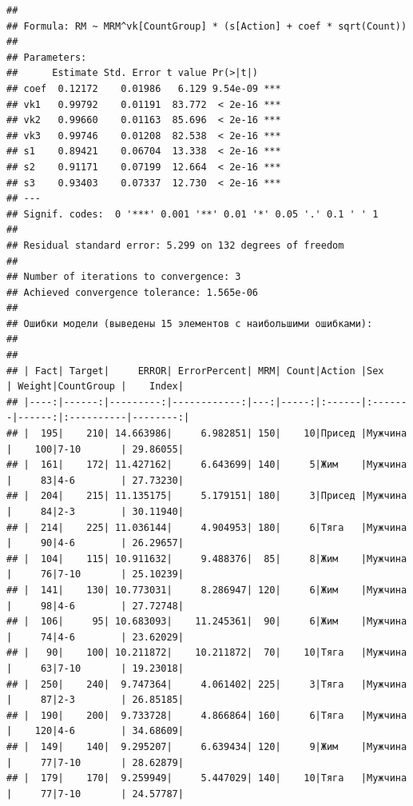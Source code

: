 \documentclass[
]{article}
\newenvironment{Shaded}{\begin{snugshade}}{\end{snugshade}}
\newcommand{\KeywordTok}[1]{\textcolor[rgb]{0.13,0.29,0.53}{\textbf{#1}}}
\newcommand{\NormalTok}[1]{#1}
\newcommand{\OperatorTok}[1]{\textcolor[rgb]{0.81,0.36,0.00}{\textbf{#1}}}
\newcommand{\StringTok}[1]{\textcolor[rgb]{0.31,0.60,0.02}{#1}}
\begin{document}
\begin{Shaded}
\end{Shaded}

\begin{verbatim}
## 
## Formula: RM ~ MRM^vk[CountGroup] * (s[Action] + coef * sqrt(Count))
## 
## Parameters:
##      Estimate Std. Error t value Pr(>|t|)    
## coef  0.12172    0.01986   6.129 9.54e-09 ***
## vk1   0.99792    0.01191  83.772  < 2e-16 ***
## vk2   0.99660    0.01163  85.696  < 2e-16 ***
## vk3   0.99746    0.01208  82.538  < 2e-16 ***
## s1    0.89421    0.06704  13.338  < 2e-16 ***
## s2    0.91171    0.07199  12.664  < 2e-16 ***
## s3    0.93403    0.07337  12.730  < 2e-16 ***
## ---
## Signif. codes:  0 '***' 0.001 '**' 0.01 '*' 0.05 '.' 0.1 ' ' 1
## 
## Residual standard error: 5.299 on 132 degrees of freedom
## 
## Number of iterations to convergence: 3 
## Achieved convergence tolerance: 1.565e-06
## 
## Ошибки модели (выведены 15 элементов с наибольшими ошибками): 
## 
## 
## | Fact| Target|     ERROR| ErrorPercent| MRM| Count|Action |Sex     | Weight|CountGroup |    Index|
## |----:|------:|---------:|------------:|---:|-----:|:------|:-------|------:|:----------|--------:|
## |  195|    210| 14.663986|     6.982851| 150|    10|Присед |Мужчина |    100|7-10       | 29.86055|
## |  161|    172| 11.427162|     6.643699| 140|     5|Жим    |Мужчина |     83|4-6        | 27.73230|
## |  204|    215| 11.135175|     5.179151| 180|     3|Присед |Мужчина |     84|2-3        | 30.11940|
## |  214|    225| 11.036144|     4.904953| 180|     6|Тяга   |Мужчина |     90|4-6        | 26.29657|
## |  104|    115| 10.911632|     9.488376|  85|     8|Жим    |Мужчина |     76|7-10       | 25.10239|
## |  141|    130| 10.773031|     8.286947| 120|     6|Жим    |Мужчина |     98|4-6        | 27.72748|
## |  106|     95| 10.683093|    11.245361|  90|     6|Жим    |Мужчина |     74|4-6        | 23.62029|
## |   90|    100| 10.211872|    10.211872|  70|    10|Тяга   |Мужчина |     63|7-10       | 19.23018|
## |  250|    240|  9.747364|     4.061402| 225|     3|Тяга   |Мужчина |     87|2-3        | 26.85185|
## |  190|    200|  9.733728|     4.866864| 160|     6|Тяга   |Мужчина |    120|4-6        | 34.68609|
## |  149|    140|  9.295207|     6.639434| 120|     9|Жим    |Мужчина |     77|7-10       | 28.62879|
## |  179|    170|  9.259949|     5.447029| 140|    10|Тяга   |Мужчина |     77|7-10       | 24.57787|

\end{verbatim}
\end{document}
